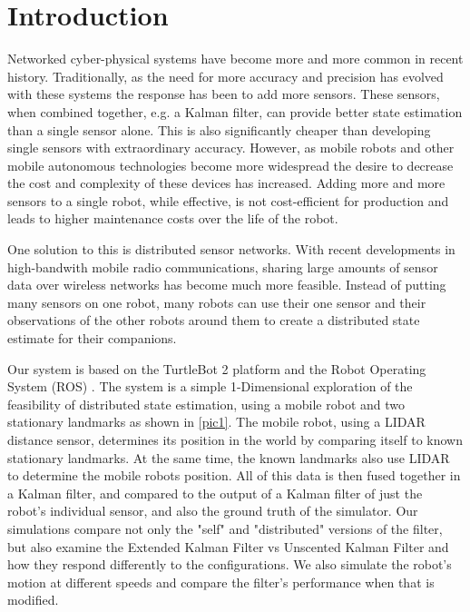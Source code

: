\documentclass[conference]{IEEEtran} \usepackage[T1]{fontenc} \usepackage[backend=biber, style=ieee]{biblatex}
\begin{document}
\section{Introduction} \label{Introduction}
Networked cyber-physical systems have become more and more common in recent history. Traditionally, as the need for more
accuracy and precision has evolved with these systems the response has been to add more sensors. These sensors, when
combined together, e.g. a Kalman filter, can provide better state estimation than a single sensor alone. This is also
significantly cheaper than developing single sensors with extraordinary accuracy. However, as mobile robots and other
mobile autonomous technologies become more widespread the desire to decrease the cost and complexity of these devices
has increased. Adding more and more sensors to a single robot, while effective, is not cost-efficient for production and
leads to higher maintenance costs over the life of the robot.

One solution to this is distributed sensor networks. With recent developments in high-bandwith mobile radio
communications, sharing large amounts of sensor data over wireless networks has become much more feasible. Instead of
putting many sensors on one robot, many robots can use their one sensor and their observations of the other robots
around them to create a distributed state estimate for their companions.

Our system is based on the TurtleBot 2 platform and the Robot Operating System (ROS) \cite{ros_original}. The system is a simple 1-Dimensional exploration of the feasibility of distributed state estimation, using a mobile robot and two stationary landmarks as shown in \ref{pic1}. The mobile robot, using a LIDAR distance sensor, determines its position in the world by comparing itself to known stationary landmarks. At the same time, the known landmarks also use LIDAR to determine the mobile robots position. All of this data is then fused together in a Kalman filter, and compared to the output of a Kalman filter of just the robot's individual sensor, and also the ground truth of the simulator. Our simulations compare not only the "self" and "distributed" versions of the filter, but also examine the Extended Kalman Filter vs Unscented Kalman Filter and how they respond differently to the configurations. We also simulate the robot's motion at different speeds and compare the filter's performance when that is modified.
\end{document}
